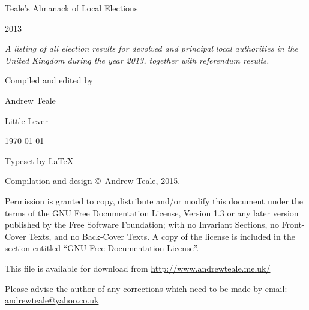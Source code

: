 \documentclass[a4paper,openany,10pt]{book}
\begin{document}

\begin{titlepage}

\begin{center}

\bigskip

\Huge Teale's Almanack of Local Elections

2013

\bigskip

\Large \emph{A listing of all election results for devolved and principal local authorities in the United Kingdom during the year 2013, together with referendum results.}

\bigskip

Compiled and edited by 

Andrew Teale

\vfill

\newcommand\versionno{0.1\%0.1\%}


Little Lever

\today

\end{center}

\end{titlepage}


\begin{center}

\bigskip

Typeset by \LaTeX{} 

\bigskip

Compilation and design \copyright\ Andrew Teale, 2015.

    Permission is granted to copy, distribute and/or modify this document
    under the terms of the GNU Free Documentation License, Version 1.3
    or any later version published by the Free Software Foundation;
    with no Invariant Sections, no Front-Cover Texts, and no Back-Cover Texts.
    A copy of the license is included in the section entitled ``GNU
    Free Documentation License''.

\bigskip

This file is available for download from
\url{http://www.andrewteale.me.uk/}

\bigskip

Please advise the author of any corrections which need to be made by
email: \url{andrewteale@yahoo.co.uk}

\vfill
\end{center}
\end{document}
